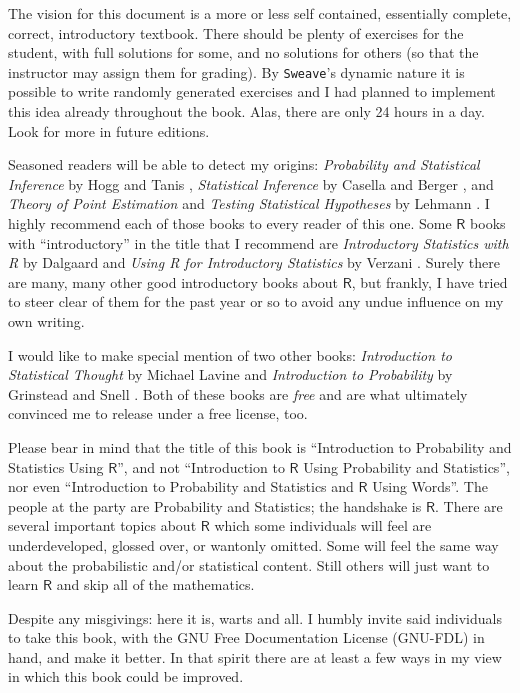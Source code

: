 The vision for this document is a more or less self contained, essentially complete, correct, introductory textbook. There should be plenty of exercises for the student, with full solutions for some, and no solutions for others (so that the instructor may assign them for grading). By \texttt{Sweave}'s dynamic nature it is possible to write randomly generated exercises and I had planned to implement this idea already throughout the book. Alas, there are only 24 hours in a day. Look for more in future editions.

Seasoned readers will be able to detect my origins: \emph{Probability and Statistical Inference} by Hogg and Tanis \cite{Hogg2006}, \emph{Statistical Inference} by Casella and Berger \cite{Casella2002}, and \emph{Theory of Point Estimation} and \emph{Testing Statistical Hypotheses} by Lehmann \cite{Lehmann1998,Lehmann1986}. I highly recommend each of those books to every reader of this one. Some \(\mathsf{R}\) books with ``introductory'' in the title that I recommend are \emph{Introductory Statistics with R} by Dalgaard \cite{Dalgaard2008} and \emph{Using R for Introductory Statistics} by Verzani \cite{Verzani2005}. Surely there are many, many other good introductory books about \(\mathsf{R}\), but frankly, I have tried to steer clear of them for the past year or so to avoid any undue influence on my own writing.

I would like to make special mention of two other books: \emph{Introduction to Statistical Thought} by Michael Lavine \cite{Lavine2009} and \emph{Introduction to Probability} by Grinstead and Snell \cite{Grinstead1997}. Both of these books are \emph{free} and are what ultimately convinced me to release \IPSUR under a free license, too.

Please bear in mind that the title of this book is ``Introduction to Probability and Statistics Using \(\mathsf{R}\)'', and not ``Introduction to \(\mathsf{R}\) Using Probability and Statistics'', nor even ``Introduction to Probability and Statistics and \(\mathsf{R}\) Using Words''. The people at the party are Probability and Statistics; the handshake is \(\mathsf{R}\). There are several important topics about \(\mathsf{R}\) which some individuals will feel are underdeveloped, glossed over, or wantonly omitted. Some will feel the same way about the probabilistic and/or statistical content. Still others will just want to learn \(\mathsf{R}\) and skip all of the mathematics.

Despite any misgivings: here it is, warts and all. I humbly invite said individuals to take this book, with the GNU Free Documentation License (GNU-FDL) in hand, and make it better. In that spirit there are at least a few ways in my view in which this book could be improved.

